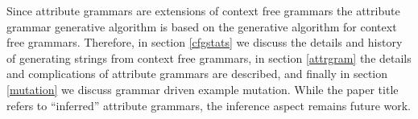 Since attribute grammars are extensions of context free grammars the attribute
grammar generative algorithm is based on the generative algorithm for context
free grammars. Therefore, in section \ref{cfgstats} we discuss the details and
history of generating strings from context free grammars, in section
\ref{attrgram} the details and complications of attribute grammars are
described, and finally in section \ref{mutation} we discuss grammar driven
example mutation. While the paper title refers to ``inferred'' attribute
grammars, the inference aspect remains future work. 

